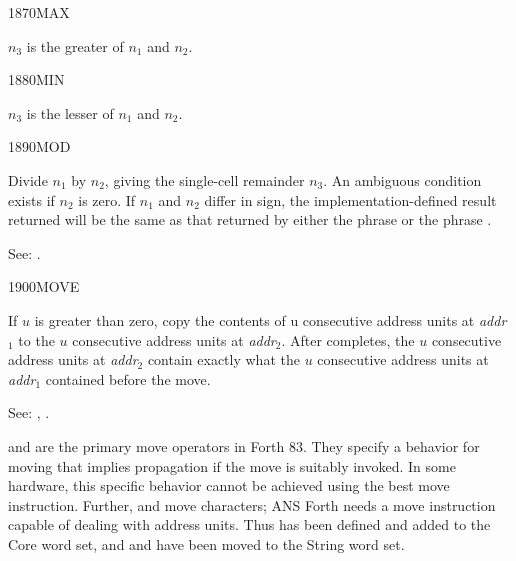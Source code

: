 \begin{newword}{1870}{MAX}

	$n_3$ is the greater of $n_1$ and $n_2$.
\end{newword}


\begin{newword}{1880}{MIN}

	$n_3$ is the lesser of $n_1$ and $n_2$.
\end{newword}


\begin{newword}{1890}{MOD}

	Divide $n_1$ by $n_2$, giving the single-cell remainder $n_3$.
	An ambiguous condition exists if $n_2$ is zero. If $n_1$ and
	$n_2$ differ in sign, the implementation-defined result returned
	will be the same as that returned by either the phrase
	    
	or the phrase
	    .

\item[See:]
	.
\end{newword}


\begin{newword}{1900}{MOVE}

	If $u$ is greater than zero, copy the contents of u consecutive
	address units at \emph{addr}$_1$ to the $u$ consecutive address
	units at \emph{addr}$_2$. After  completes, the $u$
	consecutive address units at \emph{addr}$_2$ contain exactly
	what the $u$ consecutive address units at \emph{addr}$_1$
	contained before the move.

\item[See:]
	,
	.

	\begin{rationale} %
		 and  are the primary
		move operators in Forth 83. They specify a behavior for moving
		that implies propagation if the move is suitably invoked. In
		some hardware, this specific behavior cannot be achieved using
		the best move instruction. Further,  and
		 move characters; ANS Forth needs a move
		instruction capable of dealing with address units. Thus
		 has been defined and added to the Core word set,
		and  and  have been
		moved to the String word set.
	\end{rationale}
\end{newword}


